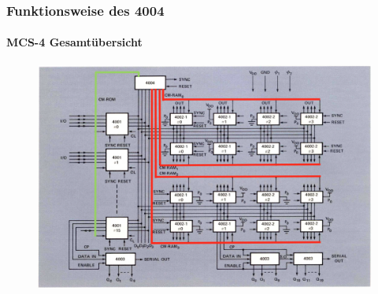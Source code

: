 \begin{frame}
	\frametitle{Funktionsweise des 4004}
	\framesubtitle{MCS-4 Gesamtübersicht}
	\begin{figure}[ht]
		\includegraphics[width=0.85
		\linewidth]{images/mcs4.png}
	\end{figure}
\end{frame}

